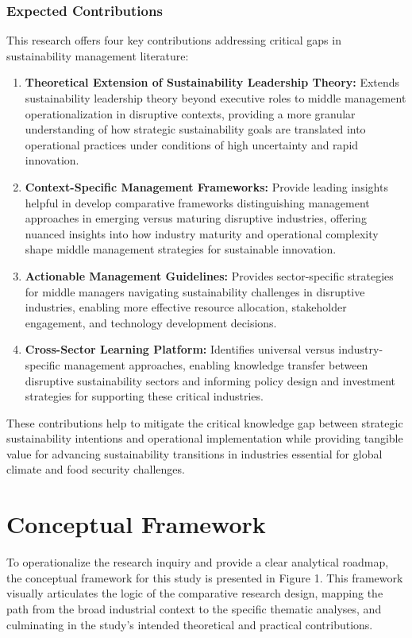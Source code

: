 	\subsubsection{Expected Contributions}
	This research offers four key contributions addressing critical gaps in sustainability management literature:
	\begin{enumerate}
		\item \textbf{Theoretical Extension of Sustainability Leadership Theory:} Extends sustainability leadership theory beyond executive roles to middle management operationalization in disruptive contexts, providing a more granular understanding of how strategic sustainability goals are translated into operational practices under conditions of high uncertainty and rapid innovation.
		\item \textbf{Context-Specific Management Frameworks:} Provide leading insights helpful in develop comparative frameworks distinguishing management approaches in emerging versus maturing disruptive industries, offering nuanced insights into how industry maturity and operational complexity shape middle management strategies for sustainable innovation.
		\item \textbf{Actionable Management Guidelines:} Provides  sector-specific strategies for middle managers navigating sustainability challenges in disruptive industries, enabling more effective resource allocation, stakeholder engagement, and technology development decisions.
		\item \textbf{Cross-Sector Learning Platform:} Identifies universal versus industry-specific management approaches, enabling knowledge transfer between disruptive sustainability sectors and informing policy design and investment strategies for supporting these critical industries.
	\end{enumerate}
	These contributions help to mitigate the critical knowledge gap between strategic sustainability intentions and operational implementation while providing tangible value for advancing sustainability transitions in industries essential for global climate and food security challenges.
	
\section*{Conceptual Framework}

To operationalize the research inquiry and provide a clear analytical roadmap, the conceptual framework for this study is presented in Figure 1. This framework visually articulates the logic of the comparative research design, mapping the path from the broad industrial context to the specific thematic analyses, and culminating in the study's intended theoretical and practical contributions.

